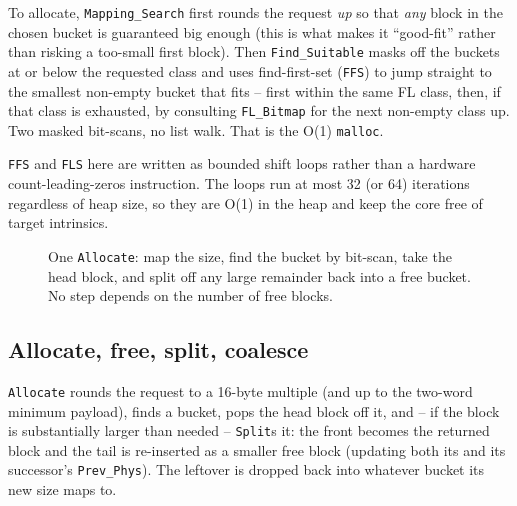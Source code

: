 To allocate, \texttt{Mapping\_Search} first rounds the request \emph{up} so that
\emph{any} block in the chosen bucket is guaranteed big enough (this is what makes
it ``good-fit'' rather than risking a too-small first block). Then
\texttt{Find\_Suitable} masks off the buckets at or below the requested class and
uses find-first-set (\texttt{FFS}) to jump straight to the smallest non-empty
bucket that fits -- first within the same FL class, then, if that class is
exhausted, by consulting \texttt{FL\_Bitmap} for the next non-empty class up. Two
masked bit-scans, no list walk. That is the O(1) \texttt{malloc}.

\texttt{FFS} and \texttt{FLS} here are written as bounded shift loops rather than
a hardware count-leading-zeros instruction. The loops run at most 32 (or 64)
iterations regardless of heap size, so they are O(1) in the heap and keep the core
free of target intrinsics.

\begin{figure}[ht]
\centering
{}
\caption{One \texttt{Allocate}: map the size, find the bucket by bit-scan, take
the head block, and split off any large remainder back into a free bucket. No
step depends on the number of free blocks.}
\label{fig:tlsf-alloc}
\end{figure}

\subsection{Allocate, free, split, coalesce}

\texttt{Allocate} rounds the request to a 16-byte multiple (and up to the
two-word minimum payload), finds a bucket, pops the head block off it, and --
if the block is substantially larger than needed -- \texttt{Split}s it: the
front becomes the returned block and the tail is re-inserted as a smaller free
block (updating both its and its successor's \texttt{Prev\_Phys}). The leftover
is dropped back into whatever bucket its new size maps to.

